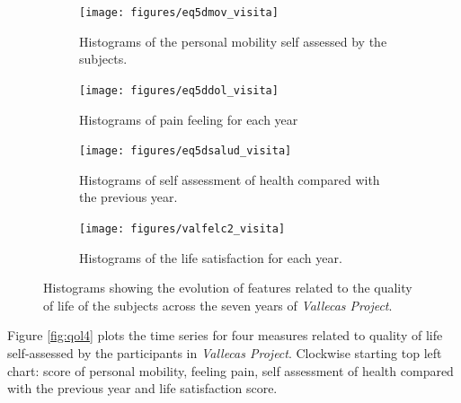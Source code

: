 \documentclass[11pt]{article}
\theoremstyle{definition}
\theoremstyle{remark}
\begin{document}
\begin{figure}[H]
    \centering
    \begin{subfigure}[t]{0.4\textwidth}
        \centering
        \texttt{[image: figures/eq5dmov\_visita]}
        \caption{Histograms of the personal mobility self assessed by the subjects.}
    \end{subfigure}
    \hfill
    \begin{subfigure}[t]{0.4\textwidth}
        \centering
        \texttt{[image: figures/eq5ddol\_visita]}
        \caption{Histograms of pain feeling for each year}
    \end{subfigure}%
    
     \begin{subfigure}[t]{0.4\textwidth}
        \centering
        \texttt{[image: figures/eq5dsalud\_visita]}
        \caption{Histograms of self assessment of health compared with the previous year.}
    \end{subfigure}
    \hfill
    \begin{subfigure}[t]{0.4\textwidth}
        \centering
        \texttt{[image: figures/valfelc2\_visita]}
        \caption{Histograms of the life satisfaction for each year.}
    \end{subfigure}%
   
    \caption{Histograms showing the evolution of features related to the quality of life of the subjects across the seven years of \emph{Vallecas Project}.}
    \label{fig:qollong}
\end{figure}

Figure \ref{fig:qol4} plots the time series for four measures related to quality of life self-assessed by the participants in \emph{Vallecas Project}. Clockwise starting top left chart: score of personal mobility, feeling pain, self assessment of health compared with the previous year and life satisfaction score.
\end{document}
